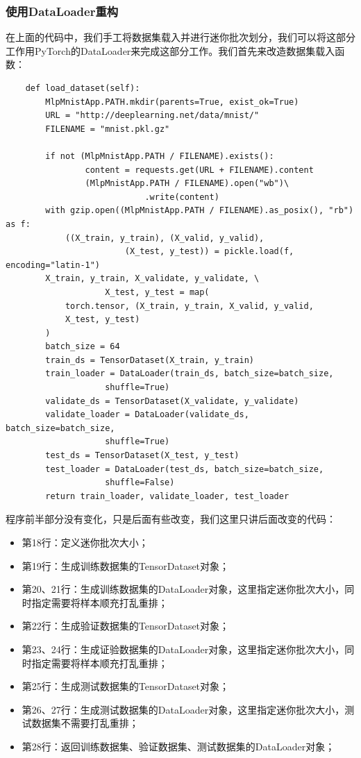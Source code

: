 \documentclass[UTF8]{article}
\begin{document}
\subsubsection{使用DataLoader重构}
在上面的代码中，我们手工将数据集载入并进行迷你批次划分，我们可以将这部分工作用PyTorch的DataLoader来完成这部分工作。我们首先来改造数据集载入函数：
\begin{lstlisting}
    def load_dataset(self):
        MlpMnistApp.PATH.mkdir(parents=True, exist_ok=True)
        URL = "http://deeplearning.net/data/mnist/"
        FILENAME = "mnist.pkl.gz"

        if not (MlpMnistApp.PATH / FILENAME).exists():
                content = requests.get(URL + FILENAME).content
                (MlpMnistApp.PATH / FILENAME).open("wb")\
                            .write(content)
        with gzip.open((MlpMnistApp.PATH / FILENAME).as_posix(), "rb") as f:
            ((X_train, y_train), (X_valid, y_valid), 
                        (X_test, y_test)) = pickle.load(f, encoding="latin-1")
        X_train, y_train, X_validate, y_validate, \
                    X_test, y_test = map(
            torch.tensor, (X_train, y_train, X_valid, y_valid, 
            X_test, y_test)
        )
        batch_size = 64
        train_ds = TensorDataset(X_train, y_train)
        train_loader = DataLoader(train_ds, batch_size=batch_size, 
                    shuffle=True)
        validate_ds = TensorDataset(X_validate, y_validate)
        validate_loader = DataLoader(validate_ds, batch_size=batch_size, 
                    shuffle=True)
        test_ds = TensorDataset(X_test, y_test)
        test_loader = DataLoader(test_ds, batch_size=batch_size, 
                    shuffle=False)
        return train_loader, validate_loader, test_loader
\end{lstlisting}
程序前半部分没有变化，只是后面有些改变，我们这里只讲后面改变的代码：
\begin{itemize}
\item 第18行：定义迷你批次大小；
\item 第19行：生成训练数据集的TensorDataset对象；
\item 第20、21行：生成训练数据集的DataLoader对象，这里指定迷你批次大小，同时指定需要将样本顺充打乱重排；
\item 第22行：生成验证数据集的TensorDataset对象；
\item 第23、24行：生成证验数据集的DataLoader对象，这里指定迷你批次大小，同时指定需要将样本顺充打乱重排；
\item 第25行：生成测试数据集的TensorDataset对象；
\item 第26、27行：生成测试数据集的DataLoader对象，这里指定迷你批次大小，测试数据集不需要打乱重排；
\item 第28行：返回训练数据集、验证数据集、测试数据集的DataLoader对象；
\end{itemize}
\end{document}
